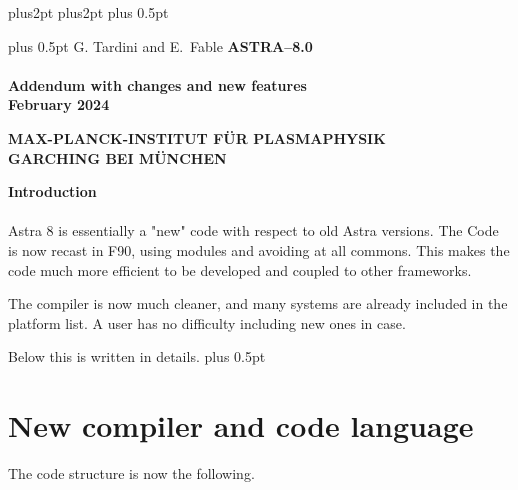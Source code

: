 \documentclass[12pt]{article}
\begin{document}
\parindent=0pt				\parskip=15pt plus2pt
\parindent=30pt				\parskip=0pt plus2pt
\baselineskip=10pt plus 0.5pt

\baselineskip=20pt plus 0.5pt
\thispagestyle{empty}
\Large\noindent
G. Tardini and E.~Fable
\vskip40mm\noindent
\LARGE\bf ASTRA--8.0 \\\\
Addendum with changes and new features
\vfill\rm\large\noindent
 \\
February 2024
\eject
\thispagestyle{empty}
\begin{center}\LARGE\bf\sf
MAX-PLANCK-INSTITUT F\"UR PLASMAPHYSIK\normalsize\\[15pt]
GARCHING BEI M\"UNCHEN
\end{center}
\vspace*{40mm}
\eject
\thispagestyle{empty}
\clearpage
{\bf Introduction}\\\\
Astra 8 is essentially a "new" code with respect to old Astra versions.
The Code is now recast in F90, using modules and avoiding at all commons.
This makes the code much more efficient to be developed and coupled to other frameworks.

The compiler is now much cleaner, and many systems are already included in the platform 
list. A user has no difficulty including new ones in case.

Below this is written in details.
\clearpage
\vfill\rm\normalsize
\baselineskip=20pt plus 0.5pt
\tableofcontents
\section{New compiler and code language}
The code structure is now the following. 
\end{document}
